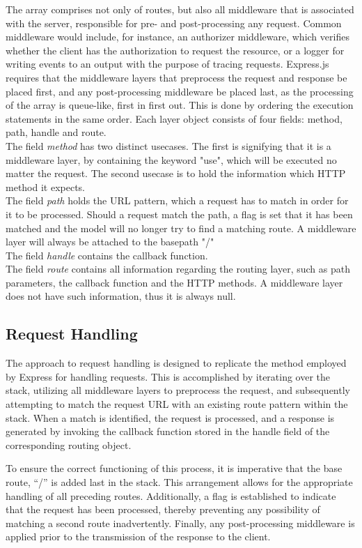 The array comprises not only of routes, but also all middleware that is associated with the server, responsible for pre- and post-processing any request. Common middleware would include, for instance, an authorizer middleware, which verifies whether the client has the authorization to request the resource, or a logger for writing events to an output with the purpose of tracing requests.
Express.js requires that the middleware layers that preprocess the request and response be placed first, and any post-processing middleware be placed last, as the processing of the array is queue-like, first in first out. This is done by ordering the execution statements in the same order.
Each layer object consists of four fields: method, path, handle and route.\\
The field \textit{method} has two distinct usecases. The first is signifying that it is a middleware layer, by containing the keyword "use", which will be executed no matter the request.
The second usecase is to hold the information which HTTP method it expects. \\
The field \textit{path} holds the URL pattern, which a request has to match in order for it to be processed. Should a request match the path, a flag is set that it has been matched and the model will no longer try to find a matching route. A middleware layer will always be attached to the basepath "/"\\
The field \textit{handle} contains the callback function.\\
The field \textit{route} contains all information regarding the routing layer, such as path parameters, the callback function and the HTTP methods. A middleware layer does not have such information, thus it is always null.
\subsection{Request Handling}
\label{sec:req-handling}
The approach to request handling is designed to replicate the method employed by Express for handling requests. This is accomplished by iterating over the stack, utilizing all middleware layers to preprocess the request, and subsequently attempting to match the request URL with an existing route pattern within the stack. When a match is identified, the request is processed, and a response is generated by invoking the callback function stored in the handle field of the corresponding routing object.

To ensure the correct functioning of this process, it is imperative that the base route, “/” is added last in the stack. This arrangement allows for the appropriate handling of all preceding routes. Additionally, a flag is established to indicate that the request has been processed, thereby preventing any possibility of matching a second route inadvertently. Finally, any post-processing middleware is applied prior to the transmission of the response to the client.

